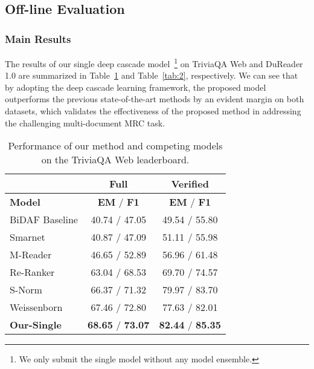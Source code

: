 \documentclass[letterpaper]{article} \usepackage{aaai19}  \usepackage{graphicx}
\begin{document}
\subsection{Off-line Evaluation}

\subsubsection{Main Results}
The results of our single deep cascade model~\footnote{\small{We only submit the single model without any model ensemble.}} on TriviaQA Web and DuReader 1.0 are summarized in Table~\ref{tab:1} and Table~\ref{tab:2}, respectively. We can see that by adopting the deep cascade learning framework, the proposed model outperforms the previous state-of-the-art methods by an evident margin on both datasets, which validates the effectiveness of the proposed method in addressing the challenging multi-document MRC task.



\begin{table}[t]
\scriptsize
\centering
\caption{\label{tab:1} Performance of our method and competing models on the TriviaQA Web leaderboard.}
\begin{tabular}{lcc}
\hline
     & \textbf{Full} & \textbf{Verified} \\
\hline
   \textbf{Model} & \textbf{EM} / \textbf{F1} & \textbf{EM} / \textbf{F1} \\
\hline
    BiDAF Baseline \cite{joshi2017triviaqa} & 40.74 / 47.05 &  49.54 / 55.80 \\
    Smarnet \cite{chen2017smarnet} & 40.87 / 47.09 & 51.11 / 55.98 \\
    M-Reader \cite{hu2017reinforced} & 46.65 / 52.89 & 56.96 / 61.48 \\
    Re-Ranker \cite{wang2017evidence} &  63.04 / 68.53 &  69.70 / 74.57 \\
    S-Norm \cite{clark2017simple} &  66.37 / 71.32 &  79.97 / 83.70 \\
Weissenborn \cite{weissenborn2017dynamic}  &  67.46 / 72.80 &  77.63 / 82.01 \\
\hline
    \textbf{Our-Single} & \textbf{68.65} / \textbf{73.07}  & \textbf{82.44} / \textbf{85.35} \\
\hline
\end{tabular} \vspace{-3mm}
\end{table} 
\end{document}
